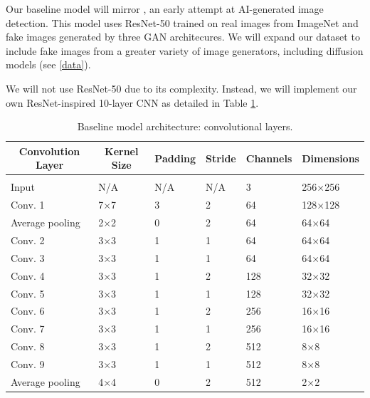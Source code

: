 \documentclass{article} %
\begin{document}
Our baseline model will mirror \citet{wang2020cnngeneratedimagessurprisinglyeasy}, an early attempt at AI-generated image detection. This model uses ResNet-50 trained on real images from ImageNet and fake images generated by three GAN architecures. We will expand our dataset to include fake images from a greater variety of image generators, including diffusion models (see \ref{data}).

We will not use ResNet-50 due to its complexity. Instead, we will implement our own ResNet-inspired 10-layer CNN as detailed in Table \ref{baseline_arch}.

    \begin{table}[t]
    \caption{Baseline model architecture: convolutional layers.}
    \label{baseline_arch}
    \begin{center}
    \begin{tabular}{llllll}
    \multicolumn{1}{c}{\bf Convolution Layer}   & \multicolumn{1}{c}{\bf Kernel Size}   & \multicolumn{1}{c}{\bf Padding}    & \multicolumn{1}{c}{\bf Stride}   & \multicolumn{1}{c}{\bf Channels}   & \multicolumn{1}{c}{\bf Dimensions}
    \\ \hline \\
    Input               & N/A   & N/A   & N/A   & 3     & 256×256 \\
    Conv. 1             & 7×7   & 3     & 2     & 64    & 128×128 \\
    Average pooling     & 2×2   & 0     & 2     & 64    & 64×64 \\
    Conv. 2             & 3×3   & 1     & 1     & 64    & 64×64 \\
    Conv. 3             & 3×3   & 1     & 1     & 64    & 64×64 \\
    Conv. 4             & 3×3   & 1     & 2     & 128   & 32×32 \\
    Conv. 5             & 3×3   & 1     & 1     & 128   & 32×32 \\
    Conv. 6             & 3×3   & 1     & 2     & 256   & 16×16 \\
    Conv. 7             & 3×3   & 1     & 1     & 256   & 16×16 \\
    Conv. 8             & 3×3   & 1     & 2     & 512   & 8×8 \\
    Conv. 9             & 3×3   & 1     & 1     & 512   & 8×8 \\
    Average pooling     & 4×4   & 0     & 2     & 512   & 2×2 \\
    \end{tabular}
    \end{center}
    \end{table}
\end{document}
